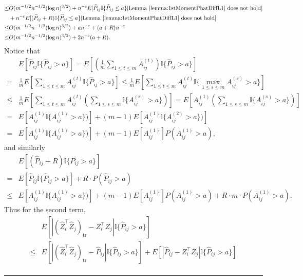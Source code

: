 \documentclass[a4paper]{article}
\newenvironment{proof}{{\bf Proof:  }}{\hfill\rule{2mm}{2mm}}
\renewcommand{\hat}{\widehat}
\begin{document}
\begin{proof}
\begin{align*}
	\le & O(m^{-1/2} n^{-1/2} (\log n)^{3/2}) + n^{-c} E[\hat{P}_{ij} \mathbb{I}\{\hat{P}_{ij} \le a\}| \mathrm{Lemma\ } \ref{lemma:1stMomentPhatDiffL1} \mathrm{\ does\ not\ hold}] \\
	& + n^{-c} E[(\hat{P}_{ij} + R) \mathbb{I}\{\hat{P}_{ij} \le a\}| \mathrm{Lemma\ } \ref{lemma:1stMomentPhatDiffL1} \mathrm{\ does\ not\ hold}] \\
	\le & O(m^{-1/2} n^{-1/2} (\log n)^{3/2}) + a n^{-c} + (a+R) n^{-c} \\
	\le & O(m^{-1/2} n^{-1/2} (\log n)^{3/2}) + 2 n^{-c} (a + R).
\end{align*}
Notice that
\begin{align*}
	& E[\hat{P}_{ij} \mathbb{I} \{ \hat{P}_{ij} > a \}]
	= E[\left(\frac{1}{m} \sum_{1 \le t \le m} A_{ij}^{(t)}\right) \mathbb{I} \{ \hat{P}_{ij} > a \}] \\
	= & \frac{1}{m} E[\sum_{1 \le t \le m} A_{ij}^{(t)} \mathbb{I} \{ \hat{P}_{ij} > a \}]
	\le \frac{1}{m} E[\sum_{1 \le t \le m} A_{ij}^{(t)} \mathbb{I} \{ \max_{1 \le s \le m} A_{ij}^{(s)} > a \}] \\
	\le & \frac{1}{m} E[\sum_{1 \le t \le m} A_{ij}^{(t)} \left(\sum_{1 \le s \le m}\mathbb{I} \{ A_{ij}^{(s)} > a \}\right)]
	= E[A_{ij}^{(1)} \left(\sum_{1 \le s \le m}\mathbb{I} \{ A_{ij}^{(s)} > a \}\right)] \\
	= & E[A_{ij}^{(1)} \mathbb{I} \{ A_{ij}^{(1)} > a \})] + (m-1) E[A_{ij}^{(1)} \mathbb{I} \{ A_{ij}^{(2)} > a \})] \\
	= & E[A_{ij}^{(1)} \mathbb{I} \{ A_{ij}^{(1)} > a \})] + (m-1) E[A_{ij}^{(1)}] P(A_{ij}^{(1)} > a),
\end{align*}
and similarly
\begin{align*}
	& E[(\hat{P}_{ij} + R) \mathbb{I} \{ \hat{P}_{ij} > a \}] \\
	= & E[\hat{P}_{ij} \mathbb{I} \{ \hat{P}_{ij} > a \}] + R \cdot P(\hat{P}_{ij} > a) \\
	\le & E[A_{ij}^{(1)} \mathbb{I} \{ A_{ij}^{(1)} > a \})] + (m-1) E[A_{ij}^{(1)}] P(A_{ij}^{(1)} > a)
	+ R \cdot m \cdot P(A_{ij}^{(1)} > a).
\end{align*}
Thus for the second term,
\begin{align*}
	& E[|(\hat{Z}_i^{\top} \hat{Z}_j)_{\mathrm{tr}} - Z_i^{\top} Z_j| \mathbb{I}\{\hat{P}_{ij} > a\}] \\
	\le & E[|(\hat{Z}_i^{\top} \hat{Z}_j)_{\mathrm{tr}} - \hat{P}_{ij}| \mathbb{I}\{\hat{P}_{ij} > a\}] + E[|\hat{P}_{ij} - Z_i^{\top} Z_j| \mathbb{I}\{\hat{P}_{ij} > a\}] \\

\end{align*}
\end{proof}
\end{document}
